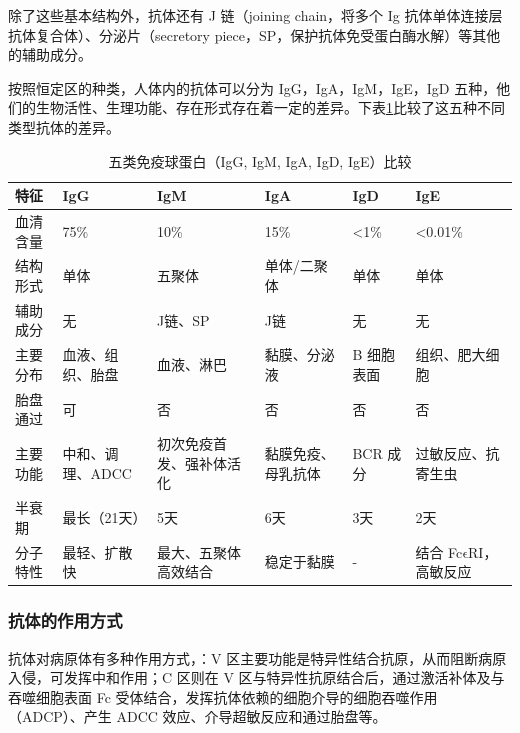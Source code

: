 \documentclass[9pt,a4paper,twoside]{rho-class/rho}
\begin{document}
        除了这些基本结构外，抗体还有 J 链（joining chain，将多个 Ig 抗体单体连接层抗体复合体）、分泌片（secretory piece，SP，保护抗体免受蛋白酶水解）等其他的辅助成分。

        按照恒定区的种类，人体内的抗体可以分为 IgG，IgA，IgM，IgE，IgD 五种，他们的生物活性、生理功能、存在形式存在着一定的差异。下表\ref{tab:immunoglobulin_compare_compact}比较了这五种不同类型抗体的差异。

        \begin{table}[H]
            \small
            \RaggedRight
            \caption{五类免疫球蛋白（IgG, IgM, IgA, IgD, IgE）比较}
            \label{tab:immunoglobulin_compare_compact}
            \begin{tabular}{l p{2.3cm} p{2.3cm} p{2.3cm} p{2.3cm} p{2.3cm}}
            \toprule
            \textbf{特征} & \textbf{IgG} & \textbf{IgM} & \textbf{IgA} & \textbf{IgD} & \textbf{IgE} \\
            \midrule
            血清含量 & 75\% & 10\% & 15\% & <1\% & <0.01\% \\
            结构形式 & 单体 & 五聚体 & 单体/二聚体 & 单体 & 单体 \\
            辅助成分 & 无 & J链、SP & J链 & 无 & 无 \\
            主要分布 & 血液、组织、胎盘 & 血液、淋巴 & 黏膜、分泌液 & B 细胞表面 & 组织、肥大细胞 \\
            胎盘通过 & 可 & 否 & 否 & 否 & 否 \\
            主要功能 & 中和、调理、ADCC & 初次免疫首发、强补体活化 & 黏膜免疫、母乳抗体 & BCR 成分 & 过敏反应、抗寄生虫 \\
            半衰期 & 最长（21天） & 5天 & 6天 & 3天 & 2天 \\
            分子特性 & 最轻、扩散快 & 最大、五聚体高效结合 & 稳定于黏膜 & - & 结合 Fc$\mathrm{\epsilon}$RI，高敏反应 \\
            \bottomrule
            \end{tabular}
        \end{table}

    \subsubsection{抗体的作用方式}


        抗体对病原体有多种作用方式，：V 区主要功能是特异性结合抗原，从而阻断病原入侵，可发挥中和作用；C 区则在 V 区与特异性抗原结合后，通过激活补体及与吞噬细胞表面 Fc 受体结合，发挥抗体依赖的细胞介导的细胞吞噬作用（ADCP）、产生 ADCC 效应、介导超敏反应和通过胎盘等。
\end{document}
